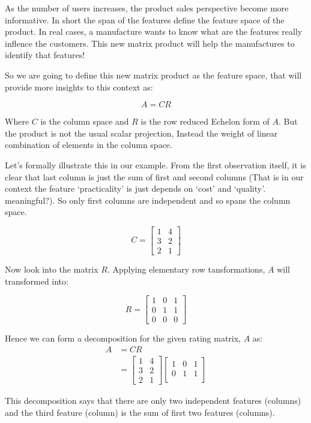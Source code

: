 \documentclass[
  letterpaper,
  DIV=11,
  numbers=noendperiod]{scrreprt}
\theoremstyle{plain}
\theoremstyle{definition}
\theoremstyle{remark}
\begin{document}
As the number of users increases, the product sales perspective become
more informative. In short the span of the features define the feature
space of the product. In real cases, a manufacture wants to know what
are the features really inflence the customers. This new matrix product
will help the manufactures to identify that features!

So we are going to define this new matrix product as the feature space,
that will provide more insights to this context as:

\[A=CR\]

Where \(C\) is the column space and \(R\) is the row reduced Echelon
form of \(A\). But the product is not the usual scalar projection,
Instead the weight of linear combination of elements in the column
space.

Let's formally illustrate this in our example. From the first
observation itself, it is clear that last column is just the sum of
first and second columns (That is in our context the feature
`practicality' is just depends on `cost' and `quality'. meaningful?). So
only first columns are independent and so spans the column space.

\[C=\begin{bmatrix}1&4\\3&2\\2&1\end{bmatrix}\]

Now look into the matrix \(R\). Applying elementary row tansformations,
\(A\) will transformed into:

\[R=\begin{bmatrix}1&0&1\\0&1&1\\0&0&0\end{bmatrix}\]

Hence we can form a decomposition for the given rating matrix, \(A\) as:
\begin{align*}
A&=CR\\
&=\begin{bmatrix}1&4\\3&2\\2&1\end{bmatrix}\begin{bmatrix}1&0&1\\0&1&1\\\mbox{}&&\end{bmatrix}
\end{align*}

This decomposition says that there are only two independent features
(columns) and the third feature (column) is the sum of first two
features (columns).
\end{document}
